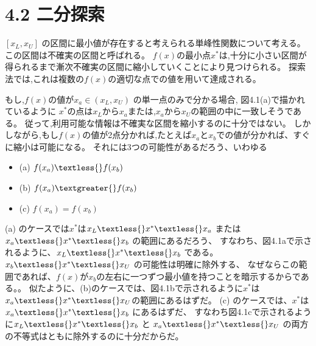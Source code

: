\section*{4.2 二分探索}\label{4-2-}

$[ x_L, x_U ]$
の区間に最小値が存在すると考えられる単峰性関数について考える。
この区間は不確実の区間と呼ばれる。
$f(x)$の最小点$x^*$は,十分に小さい区間が得られるまで漸次不確実の区間に縮小していくことにより見つけられる。
探索法では,これは複数の$f(x)$の適切な点での値を用いて達成される。

もし,$f(x)$の値が$x_a \in ( x_L , x_U )$
の単一点のみで分かる場合, 図4.1(a)で描かれているように
$x^*$の点は$x_L$から$x_a$または,$x_a$から$x_U$の範囲の中に一致しそうである。
従って,利用可能な情報は不確実な区間を縮小するのに十分ではない。
しかしながら,もし$f(x)$の値が2点分かれば,たとえば$x_a$と$x_b$での値が分かれば、すぐに縮小は可能になる。
それには3つの可能性があるだろう、いわゆる

\begin{itemize}
\tightlist
\item
  (a) $ f(x_a) \textless{} f(x_b) $
\item
  (b) $ f(x_a) \textgreater{} f(x_b) $
\item
  (c) $ f(x_a) = f(x_b) $
\end{itemize}

(a) のケースでは$x^{*}$は$ x_L \textless{} x^{*} \textless{} x_a $
または $ x_a \textless{} x^{*} \textless{} x_b $
の範囲にあるだろう、 すなわち、図4.1aで示されるように、$ x_L
\textless{} x^{*} \textless{} x_b $ である。 $ x_b
\textless{} x^{*} \textless{} x_U $ の可能性は明確に除外する、
なぜならこの範囲であれば、$ f(x)
$が$x_b$の左右に一つずつ最小値を持つことを暗示するからである。。
似たように、(b)のケースでは、図4.1bで示されるように$x^{*}$は$
x_a \textless{} x^{*} \textless{} x_U $の範囲にあるはずだ。 (c)
のケースでは、$x^{*}$は$ x_a \textless{} x^{*} \textless{}
x_b $ にあるはずだ、 すなわち図4.1cで示されるように$ x_L \textless{}
x^{*} \textless{} x_b $ と $ x_a \textless{} x^{*}
\textless{} x_U $ の両方の不等式はともに除外するのに十分だからだ。


